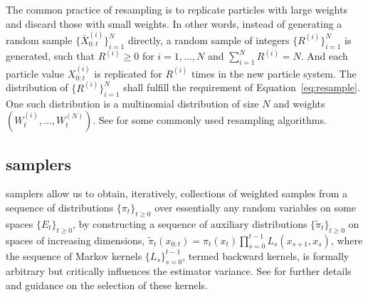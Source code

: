 \documentclass[11pt,bib,mint,hyper,altcolor]{marticle}
\begin{document}
The common practice of resampling is to replicate particles with large weights
and discard those with small weights. In other words, instead of generating a
random sample $\{\bar{X}_{0:t}^{(i)}\}_{i=1}^N$ directly, a random sample of
integers $\{R^{(i)}\}_{i=1}^N$ is generated, such that $R^{(i)} \ge 0$ for $i =
1,\dots,N$ and $\sum_{i=1}^N R^{(i)} = N$. And each particle value
$X_{0:t}^{(i)}$ is replicated for $R^{(i)}$ times in the new particle system.
The distribution of $\{R^{(i)}\}_{i=1}^N$ shall fulfill the requirement of
Equation~\eqref{eq:resample}. One such distribution is a multinomial
distribution of size $N$ and weights $(W_t^{(i)},\dots,W_t^{(N)})$. See
\textcite{Douc:2005wa} for some commonly used resampling algorithms.

\subsection{\protect\smc samplers}
\label{sub:SMC Samplers}

\smc samplers allow us to obtain, iteratively, collections of weighted samples
from a sequence of distributions $\{\pi_t\}_{t\ge0}$ over essentially any
random variables on some spaces $\{E_t\}_{t\ge0}$, by constructing a sequence
of auxiliary distributions $\{\tilde\pi_t\}_{t\ge0}$ on spaces of increasing
dimensions, $\tilde\pi_t(x_{0:t})=\pi_t (x_t) \prod_{s=0}^{t-1}
L_s(x_{s+1},x_s)$, where the sequence of Markov kernels $\{L_s\}_{s=0}^{t-1}$,
termed backward kernels, is formally arbitrary but critically influences the
estimator variance. See \textcite{DelMoral:2006hc} for further details and
guidance on the selection of these kernels.
\end{document}
